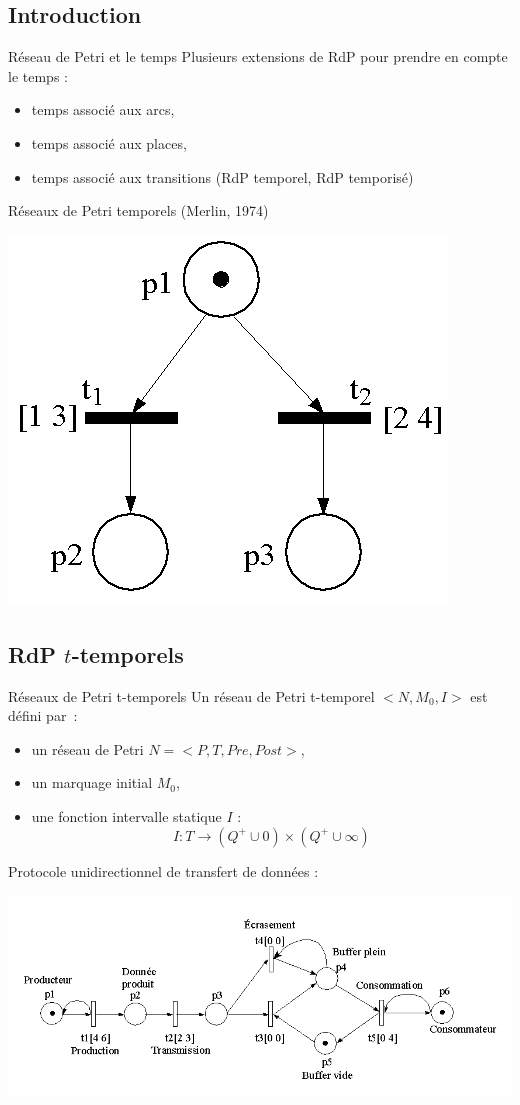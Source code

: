 \documentclass[compress]{beamer}
\begin{document}
\subsection{Introduction}
\begin{frame}{Réseau de Petri et le temps}
Plusieurs extensions de RdP pour prendre en compte le temps :
\begin{itemize}
\item temps associé aux arcs,
\item temps associé aux places,
\item temps associé aux transitions (RdP temporel, RdP temporisé)
\end{itemize}
\begin{block}{Réseaux de Petri temporels (Merlin, 1974)}
	\begin{center}
	\includegraphics[width=.3\linewidth]{rdp_s_forte}
	\end{center}
\end{block}
\end{frame}
 
\subsection{RdP $t$-temporels}
\begin{frame}{Réseaux de Petri t-temporels}
Un réseau de Petri t-temporel $<N, M_0, I>$ est défini par~:
\begin{itemize}
\item un réseau de Petri \mbox{$N = <P,T,Pre, Post>$},
\item un marquage initial $M_0$,
\item une fonction intervalle statique $I$ :
	$$I: T \rightarrow (Q^+ \cup 0) \times (Q^+ \cup \infty)$$
\end{itemize}
\vspace{.2cm}
Protocole unidirectionnel de transfert de données :
\begin{center}
\includegraphics[width=.8\linewidth]{rdp_exo}
\end{center}
\end{frame}
\end{document}
